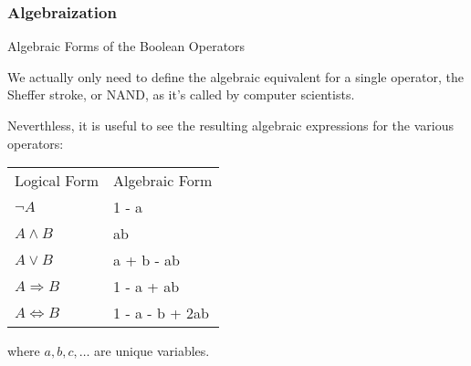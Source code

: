 \documentclass{beamer}
\begin{document}
\begin{frame}
\frametitle{Algebraization}
\begin{exampleblock}
{Algebraic Forms of the Boolean Operators}

{\small
We actually only need to define the algebraic equivalent for a single operator, the Sheffer stroke, or NAND, as it's called by computer scientists.

Neverthless, it is useful to see the resulting algebraic expressions for the various operators:}

\begin{center}
\begin{tabular}{ll}\hline
Logical Form            & Algebraic Form\\
\(\neg A\)              & 1 - a\\
\(A \land B\)           & ab\\
\(A \lor B\)            & a + b - ab\\
\(A \Rightarrow B\)     & 1 - a + ab\\
\(A \Leftrightarrow B\) & 1 - a - b + 2ab\\\hline
\end{tabular}
\end{center}

where \(a,b,c,\ldots\) are unique variables.

\end{exampleblock}
\end{frame}

\begin{frame}
\frametitle{}
\begin{block}
{}

\end{block}
\end{frame}

\begin{frame}
\frametitle{}
\begin{block}
{}

\end{block}
\end{frame}

\begin{frame}
\frametitle{}
\begin{block}
{}

\end{block}
\end{frame}
\end{document}
